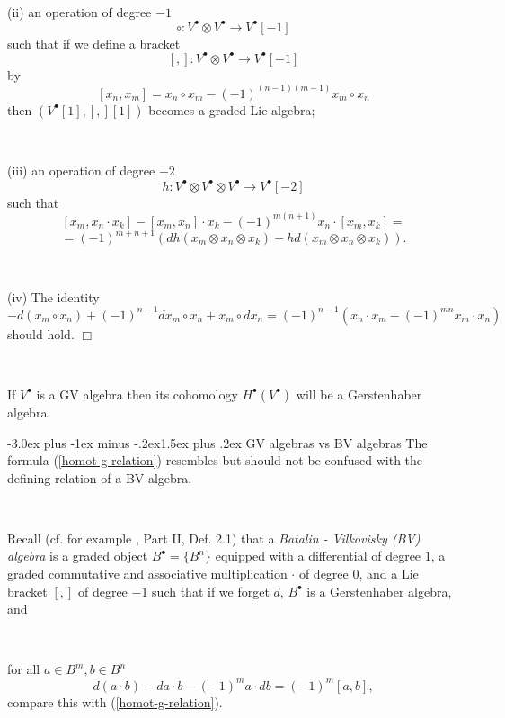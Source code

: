 \documentclass[12pt,a4paper]{article}
\makeatletter
\renewcommand{\subsection}{\@startsection{subsection}{2}{0pt}%
{-3.0ex plus -1ex minus -.2ex}{-1.5ex plus .2ex}%
{\normalfont\large\bf}}
\renewcommand{\subsection}{\@startsection{subsection}{2}{0pt}%
{-3.0ex plus -1ex minus -.2ex}{1.5ex plus .2ex}%
{\normalfont\large\bf}}
\renewcommand{\subsection}{\@startsection{subsection}{2}{0pt}%
{-3.0ex plus -1ex minus -.2ex}{-1.5ex plus .2ex}%
{\normalfont\normalsize\bf}}
\renewcommand{\subsection}{\@startsection{subsection}{2}{0pt}%
{-3.0ex plus -1ex minus -.2ex}{1.5ex plus .2ex}%
{\normalfont\normalsize\bf}}
\makeatother
\begin{document}
\

(ii) an operation of degree $-1$  
\[
\circ: V^\bullet\otimes V^\bullet \to V^\bullet[-1]
\]
such that if we define a bracket 
\[
[ , ]: V^\bullet\otimes V^\bullet \to V^\bullet[-1]
\]
by
\[
[x_n, x_m] = x_n\circ x_m - (-1)^{(n-1)(m-1)} x_m\circ x_n
\]
then $(V^\bullet[1], [ , ][1])$ becomes a graded Lie algebra;

\

(iii) an operation of degree $-2$
\[
h: V^\bullet\otimes V^\bullet\otimes V^\bullet \to V^\bullet[-2]
\]
such that
\[
[x_m, x_n\cdot x_k] - [x_m, x_n]\cdot x_k - (-1)^{m(n+1)}x_n\cdot [x_m, x_k] = 
\]
\[
= (-1)^{m+n+1}(dh(x_m\otimes x_n\otimes x_k) - hd(x_m\otimes x_n\otimes x_k)).
\]

\

(iv) The identity
\[
- d(x_m\circ x_n) + (-1)^{n-1}dx_m\circ x_n + x_m\circ dx_n = 
(-1)^{n-1}(x_n\cdot x_m - (-1)^{mn}x_m\cdot x_n)
\]
should hold. $\Box$

\

If $V^\bullet$ is a GV algebra then its cohomology $H^\bullet(V^\bullet)$ will be a Gerstenhaber algebra. 

\subsection{GV algebras vs BV algebras} The formula (\ref{homot-g-relation}) resembles 
but should not be confused with the defining relation  of a BV algebra.

\

Recall (cf. for example \cite{S}, Part II, Def. 2.1) that a {\em Batalin - Vilkovisky (BV) algebra} is a graded object $B^\bullet = \{ B^n\}$ equipped with a differential of degree $1$, a graded commutative and associative multiplication $\cdot$ of degree $0$, and a Lie bracket $[ , ]$ of degree $-1$ such that if we forget $d$, $B^\bullet$ is a Gerstenhaber algebra, and

\

for all $a\in B^m, b\in B^n$
\begin{equation}\label{bv-relation}
d(a\cdot b) - da\cdot b - (-1)^ma\cdot db  = (-1)^m [a, b], 
\end{equation}
compare this with (\ref{homot-g-relation}).

\

\end{document}
